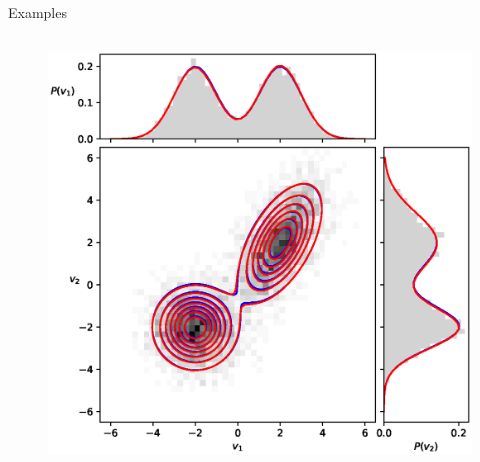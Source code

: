 \documentclass[10pt]{beamer}
\begin{document}
\begin{frame}{Examples}
\begin{figure}[t!]
\begin{center}
        \end{center}
      \end{figure}
      \vspace{-0.5cm}
      \begin{columns}
        \begin{column}[]{0.7 \textwidth}
            \begin{figure}
                \includegraphics[scale=0.30]{figures/TwoGaussians2d.eps}    

\end{figure}
\end{column}
\end{columns}
\end{frame}
\end{document}
